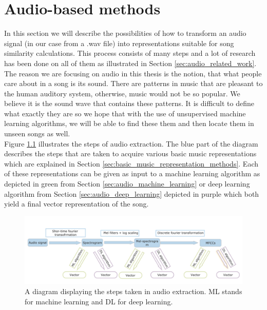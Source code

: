 \chapter{Audio-based methods}\label{chap:audio_methods}
In this section we will describe the possibilities of how to transform an audio signal (in our case from a .wav file) into representations suitable for song similarity calculations. This process consists of many steps and a lot of research has been done on all of them as illustrated in Section \ref{sec:audio_related_work}. \\
The reason we are focusing on audio in this thesis is the notion, that what people care about in a song is its sound. There are patterns in music that are pleasant to the human auditory system, otherwise, music would not be so popular. We believe it is the sound wave that contains these patterns. It is difficult to define what exactly they are so we hope that with the use of unsupervised machine learning algorithms, we will be able to find these them and then locate them in unseen songs as well. \\

Figure \ref{fig:audio_extraction} illustrates the steps of audio extraction. The blue part of the diagram describes the steps that are taken to acquire various basic music representations which are explained in Section \ref{sec:basic_music_representation_methods}. Each of these representations can be given as input to a machine learning algorithm as depicted in green from Section \ref{sec:audio_machine_learning} or deep learning algorithm from Section \ref{sec:audio_deep_learning} depicted in purple which both yield a final vector representation of the song. \\

\begin{figure}[h!]
    \centering
	\includegraphics[width=140mm]{./img/audio_feature_extraction_steps.png}
	\caption{A diagram displaying the steps taken in audio extraction. ML stands for machine learning and DL for deep learning.}
	\label{fig:audio_extraction}
\end{figure}

